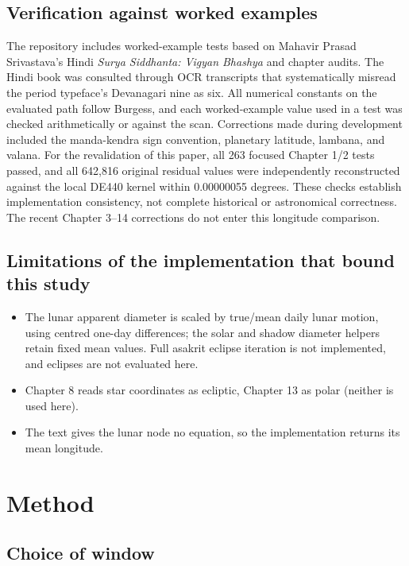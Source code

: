 \documentclass[11pt,a4paper]{article}
\begin{document}
\subsection{Verification against worked examples}

The repository includes worked-example tests based on Mahavir Prasad Srivastava's Hindi \textit{Surya Siddhanta: Vigyan Bhashya} \citep{shrivastava} and chapter audits. The Hindi book was consulted through OCR transcripts that systematically misread the period typeface's Devanagari nine as six. All numerical constants on the evaluated path follow Burgess, and each worked-example value used in a test was checked arithmetically or against the scan. Corrections made during development included the manda-kendra sign convention, planetary latitude, lambana, and valana. For the revalidation of this paper, all 263 focused Chapter 1/2 tests passed, and all 642,816 original residual values were independently reconstructed against the local DE440 kernel within 0.00000055 degrees. These checks establish implementation consistency, not complete historical or astronomical correctness. The recent Chapter 3--14 corrections do not enter this longitude comparison.

\subsection{Limitations of the implementation that bound this study}

\begin{itemize}
  \item The lunar apparent diameter is scaled by true/mean daily lunar motion, using centred one-day differences; the solar and shadow diameter helpers retain fixed mean values. Full asakrit eclipse iteration is not implemented, and eclipses are not evaluated here.
  \item Chapter 8 reads star coordinates as ecliptic, Chapter 13 as polar (neither is used here).
  \item The text gives the lunar node no equation, so the implementation returns its mean longitude.
\end{itemize}

\section{Method}
\label{sec:method}

\subsection{Choice of window}
\label{sec:window}
\end{document}
